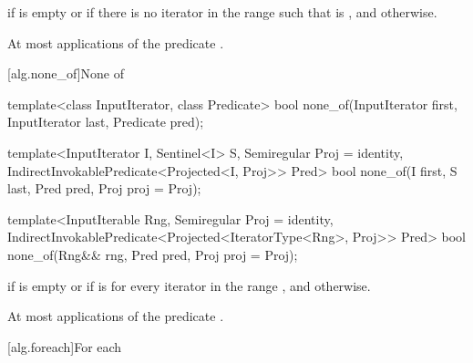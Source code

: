 \begin{itemdescr}
\pnum
\returns {} if  is empty or
if there is no iterator  in the range
 such that
is , and  otherwise.

\pnum
\complexity At most  applications of the predicate
.
\end{itemdescr}

[alg.none_of]{None of}

%
\begin{removedblock}
\begin{itemdecl}
template<class InputIterator, class Predicate>
  bool none_of(InputIterator first, InputIterator last, Predicate pred);
\end{itemdecl}
\end{removedblock}
\begin{addedblock}
\begin{itemdecl}
template<InputIterator I, Sentinel<I> S, Semiregular Proj = identity,
    IndirectInvokablePredicate<Projected<I, Proj>> Pred>
  bool none_of(I first, S last, Pred pred, Proj proj = Proj{});

template<InputIterable Rng, Semiregular Proj = identity,
    IndirectInvokablePredicate<Projected<IteratorType<Rng>, Proj>> Pred>
  bool none_of(Rng&& rng, Pred pred, Proj proj = Proj{});
\end{itemdecl}
\end{addedblock}

\begin{itemdescr}
\pnum
\returns {} if
 is empty or if
is  for every iterator  in the range ,
and  otherwise.

\pnum
\complexity At most  applications of the predicate
.
\end{itemdescr}

[alg.foreach]{For each}

